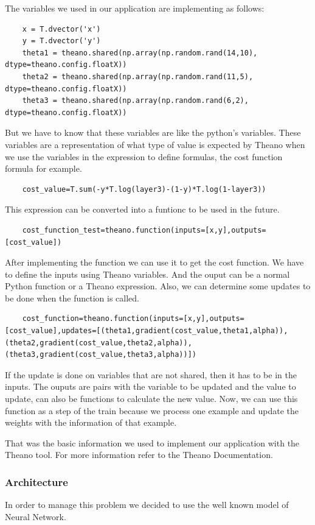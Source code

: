 \documentclass[12pt]{article}
\begin{document}
The variables we used in our application are implementing as follows:
\begin{lstlisting}
    x = T.dvector('x') 
    y = T.dvector('y') 
    theta1 = theano.shared(np.array(np.random.rand(14,10), dtype=theano.config.floatX))
    theta2 = theano.shared(np.array(np.random.rand(11,5), dtype=theano.config.floatX))
    theta3 = theano.shared(np.array(np.random.rand(6,2), dtype=theano.config.floatX))
\end{lstlisting}
But we have to know that these variables are like the python's variables. These variables are a representation of what type of value is expected by Theano when we use the variables in the expression to define formulas, the cost function formula for example.
\begin{lstlisting}
	cost_value=T.sum(-y*T.log(layer3)-(1-y)*T.log(1-layer3))
\end{lstlisting}
This expression can be converted into a funtionc to be used in the future.
\begin{lstlisting}
    cost_function_test=theano.function(inputs=[x,y],outputs=[cost_value])
\end{lstlisting}
After implementing the function we can use it to get the cost function. We have to define the inputs using Theano variables. And the ouput can be a normal Python function or a Theano expression. Also, we can determine some updates to be done when the function is called.
\begin{lstlisting}
    cost_function=theano.function(inputs=[x,y],outputs=[cost_value],updates=[(theta1,gradient(cost_value,theta1,alpha)),(theta2,gradient(cost_value,theta2,alpha)),(theta3,gradient(cost_value,theta3,alpha))])    
\end{lstlisting}
If the update is done on variables that are not shared, then it has to be in the inputs. The ouputs are pairs with the variable to be updated and the value to update, can also be functions to calculate the new value. Now, we can use this function as a step of the train because we process one example and update the weights with the information of that example.

That was the basic information we used to implement our application with the Theano tool. For more information refer to the Theano Documentation.
\subsubsection{Architecture}
\label{sec:Architecture}
In order to manage this problem we decided to use the well known model of Neural Network. 
\end{document}
